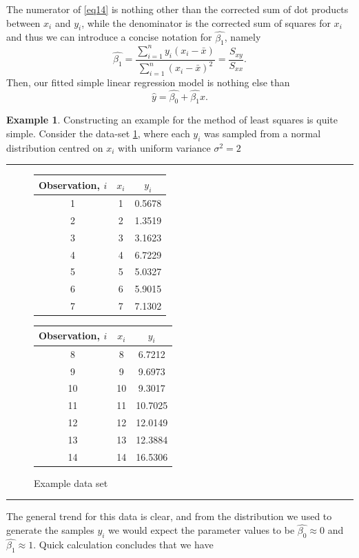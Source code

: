 \documentclass[10pt,a4paper]{article}
\numberwithin{equation}{section}
\theoremstyle{plain}
\theoremstyle{definition}
\theoremstyle{own}
\newtheorem{example}{Example}[section]
\begin{document}
The numerator of \cref{eq14} is nothing other than the corrected sum of dot products between $x_i$ and $y_i$, while the denominator is the corrected sum of squares for $x_i$ and thus we can introduce a concise notation for $\hat{\beta_1}$, namely
\begin{equation}
\hat{\beta_1} = \frac{\sum_{i=1}^n y_i (x_i - \bar{x})}{\sum_{i=1}^n (x_i - \bar{x})^2} = \frac{S_{xy}}{S_{xx}}.
\end{equation}
Then, our fitted simple linear regression model is nothing else than
\begin{equation}
\hat{y} = \hat{\beta_0} + \hat{\beta_1} x.
\end{equation}
\begin{example} \label{example31}
Constructing an example for the method of least squares is quite simple. Consider the data-set \cref{fig:dat}, where each $y_i$ was sampled from a normal distribution centred on $x_i$ with uniform variance $\sigma^2 = 2$
\vspace{2mm}
\hrule
\begin{figure}[H]
\centering
\begin{tabular}{c|c|c}
Observation, $i$ & $x_i$ & $y_i$ \\
\hline
\hline
1 &1&0.5678 \\
2 &2&1.3519 \\
3 &3&3.1623 \\
4 &4&6.7229 \\
5 &5&5.0327 \\
6 &6&5.9015 \\
7 &7&7.1302 \\
\end{tabular}
\quad
\quad
\quad
\quad
\begin{tabular}{c|c|c}
Observation, $i$ & $x_i$ & $y_i$ \\
\hline
\hline
8 &8&6.7212 \\
9 &9&9.6973 \\
10 &10&9.3017 \\
11 &11&10.7025 \\
12 &12&12.0149 \\
13 &13&12.3884 \\
14 &14& 16.5306\\
\end{tabular}
\caption{\small{Example data set}}
\label{fig:dat}
\end{figure}
\hrule
\vspace{2mm}
The general trend for this data is clear, and from the distribution we used to generate the samples $y_i$ we would expect the parameter values to be $\hat{\beta_0} \approx 0$ and $\hat{\beta_1} \approx 1$. Quick calculation concludes that we have

\end{example}
\end{document}
